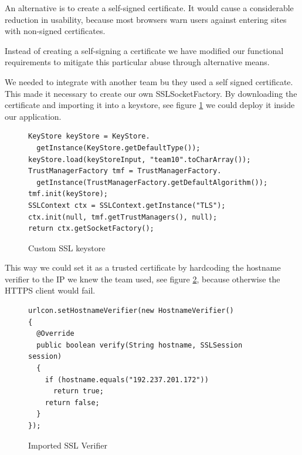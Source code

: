 \documentclass[a4paper]{article}
\begin{document}
An alternative is to create a self-signed certificate. It would cause a considerable reduction in usability, because most browsers warn users against entering sites with non-signed certificates. 

Instead of creating a self-signing a certificate we have modified our functional requirements to mitigate this particular abuse through alternative means.

We needed to integrate with another team bu they used a self signed certificate. This made it necessary to create our own SSLSocketFactory. By downloading the certificate and importing it into a keystore, see figure \ref{fig:ssl_keystore} we could deploy it inside our application. 
\begin{figure}
\caption{Custom SSL keystore}
\label{fig:ssl_keystore}   
\begin{lstlisting}
KeyStore keyStore = KeyStore.
  getInstance(KeyStore.getDefaultType());
keyStore.load(keyStoreInput, "team10".toCharArray());
TrustManagerFactory tmf = TrustManagerFactory.
  getInstance(TrustManagerFactory.getDefaultAlgorithm());
tmf.init(keyStore);
SSLContext ctx = SSLContext.getInstance("TLS");
ctx.init(null, tmf.getTrustManagers(), null);
return ctx.getSocketFactory();
\end{lstlisting}
\end{figure}
This way we could set it as a trusted certificate by hardcoding the hostname verifier to the IP we knew the team used, see figure \ref{fig:ssl_verifier}, because otherwise the HTTPS client would fail.

\begin{figure}
\caption{Imported SSL Verifier}
\label{fig:ssl_verifier}   
\begin{lstlisting}
urlcon.setHostnameVerifier(new HostnameVerifier()
{
  @Override
  public boolean verify(String hostname, SSLSession session)
  {
    if (hostname.equals("192.237.201.172"))
      return true;
    return false;
  }
});
\end{lstlisting}
\end{figure}



\end{document}
